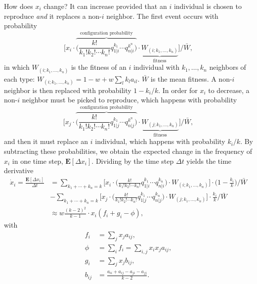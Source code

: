 \documentclass[14pt, justified]{tufte-book}
\begin{document}
How does $x_i$ change?
It can increase provided that an $i$ individual is chosen to reproduce \emph{and} it replaces a non-$i$ neighbor.
The first event occurs with probability
\begin{equation}
    \Big[ x_i \cdot \overbrace{\Big( \frac{k!}{k_1! k_2! \cdots k_n!} q_{1|i}^{k_1} \cdots q_{n|i}^{k^n} \Big)}^{\textrm{configuration probability}} \cdot \underbrace{W_{(i; k_1, \ldots ,k_n)}}_{\textrm{fitness}} \Big] \Big/ \bar{W},
\end{equation}
in which $W_{(i; k_1, \ldots ,k_n)}$ is the fitness of an $i$ individual with $k_1, \ldots , k_n$ neighbors of each type: $W_{(i; k_1, \ldots ,k_n)} = 1 - w + w \sum_l k_l a_{il}$.
$\bar{W}$ is the mean fitness.
A non-$i$ neighbor is then replaced with probability $1 - k_i/k$.
In order for $x_i$ to decrease, a non-$i$ neighbor must be picked to reproduce, which happens with probability
\begin{equation}
    \Big[ x_j \cdot \overbrace{\Big( \frac{k!}{k_1! k_2! \cdots k_n!} q_{1|j}^{k_1} \cdots q_{n|j}^{k^n} \Big)}^{\textrm{configuration probability}} \cdot \underbrace{W_{(j; k_1, \ldots ,k_n)}}_{\textrm{fitness}} \Big] \Big/ \bar{W},
\end{equation}
and then it must replace an $i$ individual, which happens with probability $k_i/k$.
By subtracting these probabilities, we obtain the expected change in the frequency of $x_i$ in one time step, $\mathbf{E}[\Delta x_i]$.
Dividing by the time step $\Delta t$ yields the time derivative
\begin{equation}
    \begin{split}
        \dot{x}_i = \frac{\mathbf{E}[\Delta x_i]}{\Delta t} & = \sum_{k_1 + \cdots + k_n = k}  \Big[ x_i \cdot \Big( \frac{k!}{k_1! k_2! \cdots k_n!} q_{1|i}^{k_1} \cdots q_{n|i}^{k_n} \Big) \cdot W_{(i; k_1, \ldots ,k_n)} \Big] \cdot \Big(1 - \frac{k_i}{k} \Big)\Big/ \bar{W}
        \\
        & - \sum_{k_1 + \cdots + k_n = k} \Big[ x_j \cdot \Big( \frac{k!}{k_1! k_2! \cdots k_n!} q_{1|j}^{k_1} \cdots q_{n|j}^{k_n} \Big) \cdot W_{(j; k_1, \ldots ,k_n)} \Big] \cdot \frac{k_i}{k} \Big/ \bar{W}
        \\
        & \approx w \frac{(k-2)^2}{k-1} \cdot x_i (f_i + g_i - \phi),
    \end{split}
    \label{eq:bd_replicator}
\end{equation}
with
\begin{equation}
    \begin{split}
        f_i & = \sum_j x_j a_{ij},
        \\
        \phi & = \sum_i f_i = \sum_{i,j} x_i x_j a_{ij},
        \\
        g_i & = \sum_j x_j b_{ij},
        \\
        b_{ij} & = \frac{a_{ii} + a_{ij} - a_{ji} - a_{jj}}{k-2}.
    \end{split}
    \label{eq:bd_coeffs}
\end{equation}
\end{document}
